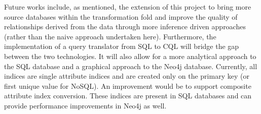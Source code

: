 \documentclass[12pt]{article}
\begin{document}
    Future works include, as mentioned, the extension of this project to bring more source databases within the transformation fold and improve the quality of relationships derived from the data through more inference driven approaches (rather than the naive approach undertaken here). Furthermore, the implementation of a query translator from SQL to CQL will bridge the gap between the two technologies. It will also allow for a more analytical approach to the SQL database and a graphical approach to the Neo4j database. Currently, all indices are single attribute indices and are created only on the primary key (or first unique value for NoSQL). An improvement would be to support composite attribute index conversion. These indices are present in SQL databases and can provide performance improvements in Neo4j as well.

    \newpage

    
    
\end{document}
